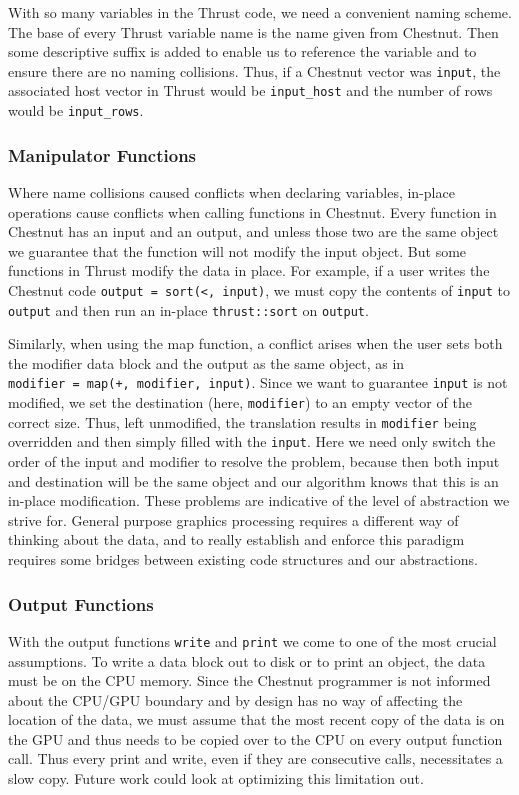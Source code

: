 \documentclass[twocolumn]{article}
\renewcommand{\|}{\origbar} %
\newcommand{\code}[1]{\texttt{#1}}
\begin{document}
With so many variables in the Thrust code, we need a convenient naming scheme. The base of every Thrust variable name is the name given from Chestnut. Then some descriptive suffix is added to enable us to reference the variable and to ensure there are no naming collisions. Thus, if a Chestnut vector was \code{input}, the associated host vector in Thrust would be \code{input\_host} and the number of rows would be \code{input\_rows}.

\subsubsection{Manipulator Functions}

Where name collisions caused conflicts when declaring variables, in-place operations cause conflicts when calling functions in Chestnut. Every function in Chestnut has an input and an output, and unless those two are the same object we guarantee that the function will not modify the input object. But some functions in Thrust modify the data in place. For example, if a user writes the Chestnut code \code{output~=~sort(<,~input)}, we must copy the contents of \code{input} to \code{output} and then run an in-place \code{thrust::sort} on \code{output}. 

Similarly, when using the map function, a conflict arises when the user sets both the modifier data block and the output as the same object, as in \code{modifier~=~map(+,~modifier,~input)}. Since we want to guarantee \code{input} is not modified, we set the destination (here, \code{modifier}) to an empty vector of the correct size. Thus, left unmodified, the translation results in \code{modifier} being overridden and then simply filled with the \code{input}. Here we need only switch the order of the input and modifier to resolve the problem, because then both input and destination will be the same object and our algorithm knows that this is an in-place modification. These problems are indicative of the level of abstraction we strive for. General purpose graphics processing requires a different way of thinking about the data, and to really establish and enforce this paradigm requires some bridges between existing code structures and our abstractions.

\subsubsection{Output Functions}

With the output functions \code{write} and \code{print} we come to one of the most crucial assumptions. To write a data block out to disk or to print an object, the data must be on the CPU memory. Since the Chestnut programmer is not informed about the CPU/GPU boundary and by design has no way of affecting the location of the data, we must assume that the most recent copy of the data is on the GPU and thus needs to be copied over to the CPU on every output function call. Thus every print and write, even if they are consecutive calls, necessitates a slow copy. Future work could look at optimizing this limitation out. 
\end{document}
